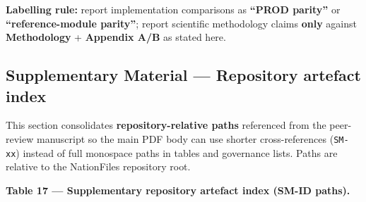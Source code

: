 \documentclass[
  11pt,
  peerreview,journal,onecolumn]{IEEEtran}
\newcommand{\passthrough}[1]{#1}
\begin{document}
\textbf{Labelling rule:} report implementation comparisons as
\textbf{``PROD parity''} or \textbf{``reference-module parity''}; report
scientific methodology claims \textbf{only} against \textbf{Methodology}
+ \textbf{Appendix A/B} as stated here.

\clearpage

\hypertarget{supplementary-material-repository-artefact-index}{%
\subsection{Supplementary Material --- Repository artefact
index}\label{supplementary-material-repository-artefact-index}}

This section consolidates \textbf{repository-relative paths} referenced
from the peer-review manuscript so the main PDF body can use shorter
cross-references (\passthrough{\lstinline!SM-xx!}) instead of full
monospace paths in tables and governance lists. Paths are relative to
the NationFiles repository root.

\textbf{Table 17 --- Supplementary repository artefact index (SM-ID
paths).}
\end{document}
